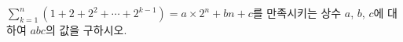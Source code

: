 $\displaystyle\sum_{k=1}^{n}(1+2+2^2+\cdots+2^{k-1})=a\times2^n+bn+c$를 만족시키는 상수 $a$, $b$, $c$에 대하여 $abc$의 값을 구하시오.
